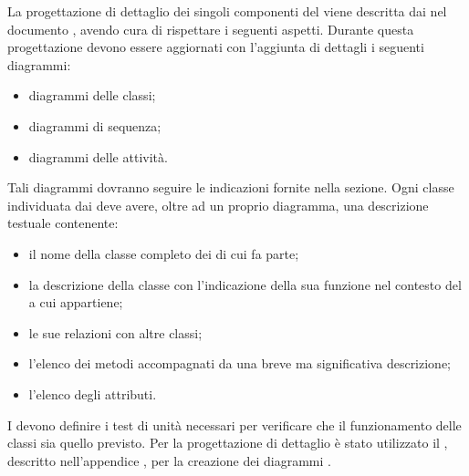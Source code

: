 La progettazione di dettaglio dei singoli componenti del  \projectname{} viene descritta dai  nel documento , avendo cura di rispettare i seguenti aspetti.
Durante questa progettazione devono essere aggiornati con l'aggiunta di dettagli i seguenti diagrammi:
\begin{itemize}
\item diagrammi delle classi;
\item diagrammi di sequenza;
\item diagrammi delle attività.
\end{itemize}
Tali diagrammi dovranno seguire le indicazioni fornite nella sezione.
Ogni classe individuata dai  deve avere, oltre ad un proprio diagramma, una descrizione testuale contenente:
\begin{itemize}
\item il nome della classe completo dei  di cui fa parte;
\item la descrizione della classe con l'indicazione della sua funzione nel contesto del  a cui appartiene;
\item le sue relazioni con altre classi;
\item l'elenco dei metodi accompagnati da una breve ma significativa descrizione;
\item l'elenco degli attributi.
\end{itemize}
I  devono definire i test di unità necessari per verificare che il funzionamento delle classi sia quello previsto.
Per la progettazione di dettaglio è stato utilizzato il  , descritto nell'appendice , per la creazione dei diagrammi .

